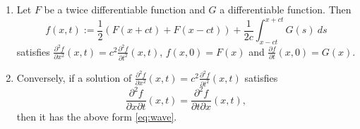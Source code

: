 \begin{theorem}
    \begin{enumerate}
        \item
              Let \(F\) be a twice differentiable function and \(G\) a differentiable function. Then
              \begin{equation}
                  \label{eq:wave}
                  f(x,t) := \frac{1}{2}(F(x+ct) + F(x-ct)) + \frac{1}{2c} \int_{x-ct}^{x+ct} G(s) \ ds
              \end{equation}
              satisfies \(   \frac{\partial^2 f}{\partial x^2}(x,t) = c^2  \frac{\partial^2 f}{\partial t^2}(x,t) \),
              \(f(x,0) = F(x)\)
              and \(\frac{\partial f}{\partial t}(x,0) = G(x)\).
        \item
              Conversely, if a solution of  \(   \frac{\partial^2 f}{\partial x^2}(x,t) = c^2  \frac{\partial^2 f}{\partial t^2}(x,t) \) satisfies
              \[\frac{\partial^2 f}{\partial x \partial t}(x,t) = \frac{\partial^2 f}{\partial t \partial x}(x,t),\]
              then it has the above form \eqref{eq:wave}.
    \end{enumerate}

\end{theorem}





